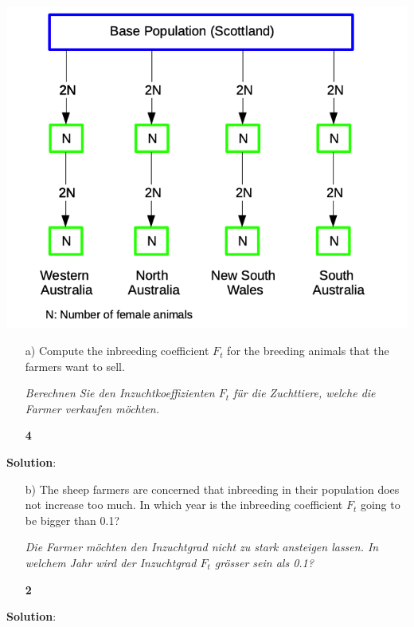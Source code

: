 \documentclass[
]{article}
\newcommand{\points}[1]
{\begin{flushright}\textbf{#1}\end{flushright}}
\newcommand{\solstart}
{\vspace{3ex}\textbf{Solution}:}
\begin{document}
\includegraphics{odg/fig-sub-pop.png}

\vspace{3ex}

\begin{enumerate}
\item[a)] Compute the inbreeding coefficient $F_t$ for the breeding animals that the farmers want to sell. 

\textit{Berechnen Sie den Inzuchtkoeffizienten $F_t$ für die Zuchttiere, welche die Farmer verkaufen möchten.}
\points{4}
\end{enumerate}

\solstart

\clearpage
\pagebreak

\begin{enumerate}
\item[b)] The sheep farmers are concerned that inbreeding in their population does not increase too much. In which year is the inbreeding coefficient $F_t$ going to be bigger than 0.1?

\textit{Die Farmer möchten den Inzuchtgrad nicht zu stark ansteigen lassen. In welchem Jahr wird der Inzuchtgrad $F_t$ grösser sein als 0.1?}
\points{2}
\end{enumerate}

\solstart

\clearpage
\pagebreak
\end{document}
